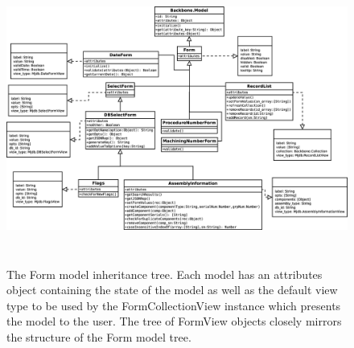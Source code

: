 \documentclass[journal]{IEEEtran}
\begin{document}
\begin{figure}[!p]
\centering
\includegraphics[height=3.75in]{Models}
\caption{The Form model inheritance tree. Each model has an attributes object containing the state of the model as well as the default
view type to be used by the FormCollectionView instance which presents the model to the user. The tree of FormView objects closely mirrors
the structure of the Form model tree.}
\label{models}
\end{figure}

\clearpage

%
%

\end{document}
